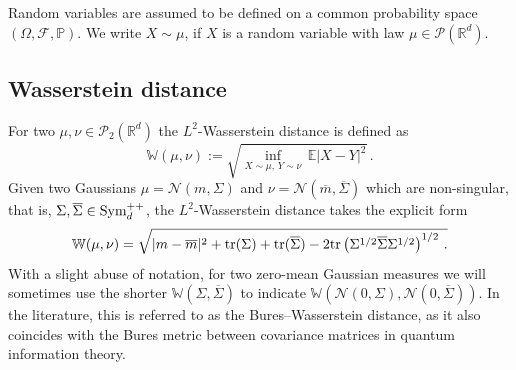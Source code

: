 \documentclass{article}
\theoremstyle{plain}
\theoremstyle{definition}
\theoremstyle{remark}
\newcommand{\Rd}{ {\mathbb{R}^d}}
\newcommand{\pd}{\textup{Sym}^{++}_d}
\newcommand{\tr}{\textup{tr}}
\newcommand{\W}{\mathbb{W}}
\begin{document}
Random variables are assumed to be defined on a common probability space $(\Omega, \mathcal{F}, \mathbb{P})$. We write $X\sim \mu$, if $X$ is a random variable with law $\mu\in \mathcal{P}(\Rd)$. 

\subsection{Wasserstein distance}
For two $\mu, \nu\in \mathcal{P}_2(\Rd)$ the $L^2$-Wasserstein distance \cite{santambrogio2015optimal} is defined as
\[
\W(\mu, \nu) := \sqrt{\inf_{X\sim \mu,\, Y\sim \nu} \, \mathbb{E} |X - Y |^2}\,.
\]
Given two Gaussians $\mu = \mathcal{N}(m, \Sigma)$ and $\nu = \mathcal{N}(\overline{m}, \overline{\Sigma})$ which are non-singular, that is, $\Sigma, \overline{\Sigma}\in \pd$, the $L^2$-Wasserstein distance takes the explicit form \cite{givens1984class,olkin1982,dowson1983gauss}
\[
\W(\mu, \nu) = \sqrt{
|m - \overline{m}|^2 + \tr(\Sigma) + \tr(\overline{\Sigma}) -  2\tr\left (\Sigma^{1/2}\overline{\Sigma} \Sigma^{1/2} \right)^{1/2}\,.
}
\]
With a slight abuse of notation, for two zero-mean Gaussian measures we will sometimes use the shorter  $\W(\Sigma, \overline{\Sigma})$ to indicate $\W\left(\mathcal{N}(0,\Sigma),\mathcal{N}(0, \overline{\Sigma}) \right)$. In the literature, this is referred to as the Bures--Wasserstein distance, as it also coincides with the Bures metric \cite{uhlmann1992metric} between covariance matrices in quantum information theory.
\end{document}

